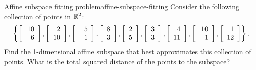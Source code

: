 \documentclass{ximera}
\begin{document}
\begin{example}{Affine subspace fitting problem}{affine-subspace-fitting}
  Consider the following collection of points in $\R^2$:
  \begin{equation*}
    \set{
      \startmat{r} 10 \\ -6 \stopmat,
      \startmat{r} 2 \\ 10 \stopmat,
      \startmat{r} 5 \\ -1 \stopmat,
      \startmat{r} 8 \\ 3 \stopmat,
      \startmat{r} 2 \\ 5 \stopmat,
      \startmat{r} 3 \\ 3 \stopmat,
      \startmat{r} 4 \\ 11 \stopmat,
      \startmat{r} 10 \\ -1 \stopmat,
      \startmat{r} 1 \\ 12 \stopmat
    }.
  \end{equation*}
  Find the 1-dimensional affine subspace that best approximates this
  collection of points. What is the total squared distance of the
  points to the subspace?
\end{example}
\end{document}
